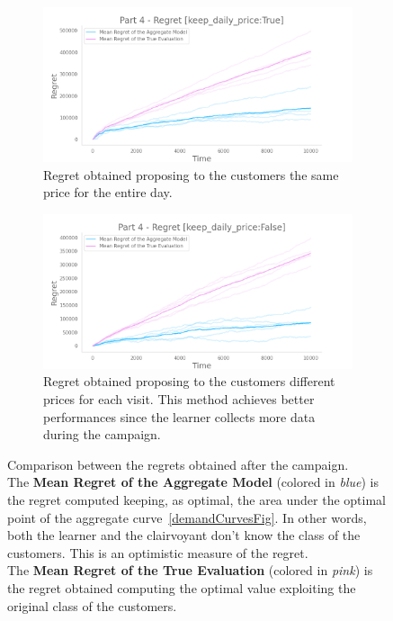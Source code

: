 \begin{figure}[!htb]
	\centering
	
	\begin{subfigure}[!H]{0.8\textwidth}
		\centering
		\includegraphics[width=\textwidth]{images/part4_keep-daily-priceTrue.png}
		\caption{Regret obtained proposing to the customers the same price for the entire day.}
	\end{subfigure}
	\begin{subfigure}[!H]{0.8\textwidth}
		\centering
		\includegraphics[width=\textwidth]{images/part4_keep-daily-priceFalse.png}
		\caption{Regret obtained proposing to the customers different prices for each visit. This method achieves better performances since the learner collects more data during the campaign.}
	\end{subfigure}

	\caption{Comparison between the regrets obtained after the campaign.\\
			The \textbf{Mean Regret of the Aggregate Model} (colored in \textit{blue}) is the regret computed keeping, as optimal, the area under the optimal point of the aggregate curve~\ref{demandCurvesFig}. In other words, both the learner and the clairvoyant don't know the class of the customers. This is an optimistic measure of the regret.\\
			The \textbf{Mean Regret of the True Evaluation} (colored in \textit{pink}) is the regret obtained computing the optimal value exploiting the original class of the customers.}
\end{figure}